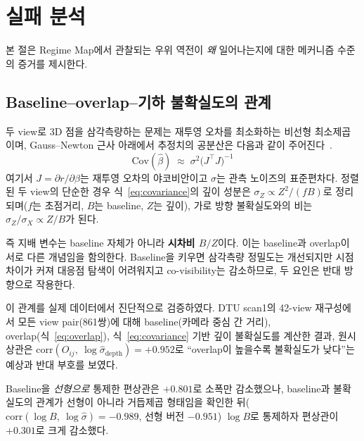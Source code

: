\section{실패 분석}
\label{sec:failure}

본 절은 Regime Map에서 관찰되는 우위 역전이 \emph{왜} 일어나는지에 대한 메커니즘 수준의 증거를 제시한다.

\subsection{Baseline--overlap--기하 불확실도의 관계}
\label{sec:confound}

두 view로 3D 점을 삼각측량하는 문제는 재투영 오차를 최소화하는 비선형 최소제곱이며, Gauss--Newton 근사 아래에서 추정치의 공분산은 다음과 같이 주어진다~\cite{hartley2003multiple}.
\begin{equation}
\mathrm{Cov}(\hat\beta) \;\approx\; \sigma^2 \bigl(J^\top J\bigr)^{-1}
\label{eq:covariance}
\end{equation}
여기서 $J = \partial r / \partial \beta$는 재투영 오차의 야코비안이고 $\sigma$는 관측 노이즈의 표준편차다. 정렬된 두 view의 단순한 경우 식~\eqref{eq:covariance}의 깊이 성분은 $\sigma_Z \propto Z^2/(fB)$로 정리되며($f$는 초점거리, $B$는 baseline, $Z$는 깊이), 가로 방향 불확실도와의 비는 $\sigma_Z/\sigma_X \propto Z/B$가 된다.

즉 지배 변수는 baseline 자체가 아니라 \textbf{시차비 $B/Z$}이다. 이는 baseline과 overlap이 서로 다른 개념임을 함의한다. Baseline을 키우면 삼각측량 정밀도는 개선되지만 시점 차이가 커져 대응점 탐색이 어려워지고 co-visibility는 감소하므로, 두 요인은 반대 방향으로 작용한다.

이 관계를 실제 데이터에서 진단적으로 검증하였다. DTU scan1의 42-view 재구성에서 모든 view pair(861쌍)에 대해 baseline(카메라 중심 간 거리), overlap(식~\eqref{eq:overlap}), 식~\eqref{eq:covariance} 기반 깊이 불확실도를 계산한 결과, 원시 상관은 $\mathrm{corr}(O_{ij},\ \log\hat\sigma_{\mathrm{depth}}) = +0.952$로 ``overlap이 높을수록 불확실도가 낮다''는 예상과 반대 부호를 보였다.

Baseline을 \emph{선형으로} 통제한 편상관은 $+0.801$로 소폭만 감소했으나, baseline과 불확실도의 관계가 선형이 아니라 거듭제곱 형태임을 확인한 뒤($\mathrm{corr}(\log B,\ \log\hat\sigma) = -0.989$, 선형 버전 $-0.951$) $\log B$로 통제하자 편상관이 $+0.301$로 크게 감소했다.

